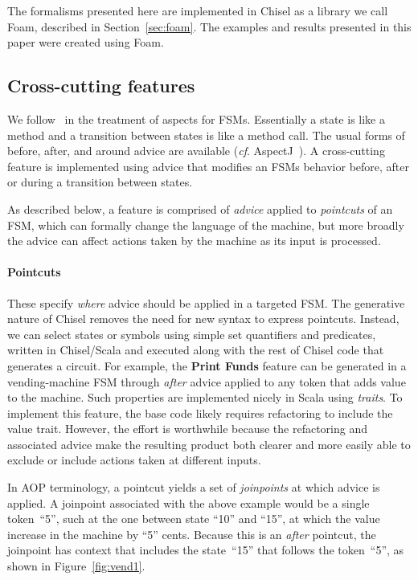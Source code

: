 \documentclass[sigplan,anonymous, review]{acmart}
\begin{document}
The formalisms presented here are implemented in Chisel as a library we call Foam, described in Section~\ref{sec:foam}.  The examples and results presented in this paper were created using Foam.  

\subsection{Cross-cutting features}\label{sec:ccut}
We follow~\cite{aspectsUML} in the treatment of aspects for FSMs.  Essentially a state is like a method and a transition between states is like a method call.  The usual forms of before, after, and around advice are available (\textit{cf}. AspectJ~\cite{AspectJ:01}).   A cross-cutting feature is implemented using advice that modifies an FSMs behavior before, after or during a transition between states.

As described below, a feature is comprised of \emph{advice} applied to \emph{pointcuts} of an FSM, which can formally change the language of the machine, but more broadly the advice can affect actions taken by the machine as its input is processed.  

\paragraph{Pointcuts} These specify \emph{where} advice should be applied in a targeted FSM.   The generative nature of Chisel removes the need for new syntax to express pointcuts.  Instead, we can select states or symbols using simple set quantifiers and predicates, written in Chisel/Scala and executed along with the rest of Chisel code that generates a circuit.  For example, the \textbf{Print Funds} feature can be generated in a vending-machine FSM through \emph{after} advice applied to any token that adds value to the machine.  Such properties are implemented nicely in Scala using \emph{traits}.  To implement this feature, the base code likely requires refactoring to include the value trait.  However, the effort is worthwhile because the refactoring and associated advice make the resulting product both clearer and more easily able to exclude or include actions taken at different inputs.

In AOP terminology, a pointcut yields a set of \emph{joinpoints} at which advice is applied.  A joinpoint associated with the above example would be a single token~``5'', such at the one between state ``10'' and ``15'', at which the value increase in the machine by ``5'' cents.  Because this is an \emph{after} pointcut, the joinpoint has context that includes the state~``15'' that follows the token~``5'', as shown in Figure~\ref{fig:vend1}. 
\end{document}
